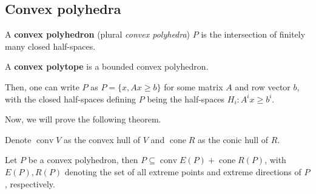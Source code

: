 \subsection{Convex polyhedra} %
\label{sub:Convex polyhedra}

\begin{definition}
  A \textbf{convex polyhedron} (plural \textit{convex polyhedra}) \( P \) is
  the intersection of finitely many closed half-spaces.

  A \textbf{convex polytope} is a bounded convex polyhedron.
\end{definition}

Then, one can write \( P \) as \( P = \{x, Ax \ge  b\}   \) for some matrix \( A
\) and row vector \( b \), with the closed half-spaces defining \( P \) being
the half-spaces \( H_{i}: A^{i}x \ge  b^{i} \).

Now, we will prove the following theorem.

\begin{theorem}
  Denote \( \operatorname{conv} V \) as the convex hull of \( V \) and \(
  \operatorname{cone} R \) as the conic hull of \( R \).

  Let \( P \) be a convex polyhedron, then \( P \subseteq \operatorname{conv} E(P) +
  \operatorname{cone} R(P)\), with \( E(P), R(P) \) denoting the set of all
  extreme points and extreme directions of \( P \), respectively.
\end{theorem}

